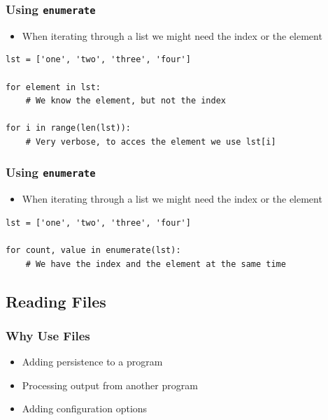 \documentclass[11pt]{beamer}
\begin{document}
\begin{frame}[fragile]\frametitle{Using \texttt{enumerate}}
\begin{itemize}
\item When iterating through a list we might need the index or the element
\end{itemize}
\begin{lstlisting}
lst = ['one', 'two', 'three', 'four']

for element in lst:
    # We know the element, but not the index

for i in range(len(lst)):
    # Very verbose, to acces the element we use lst[i]
\end{lstlisting}
\end{frame}

\begin{frame}[fragile]\frametitle{Using \texttt{enumerate}}
\begin{itemize}
\item When iterating through a list we might need the index or the element
\end{itemize}
\begin{lstlisting}
lst = ['one', 'two', 'three', 'four']

for count, value in enumerate(lst):
    # We have the index and the element at the same time
\end{lstlisting}
\end{frame}


\subsection{Reading Files}

\begin{frame}\frametitle{Why Use Files}
\begin{itemize}
\item Adding persistence to a program
\item Processing output from another program
\item Adding configuration options
\end{itemize}

\end{frame}
\end{document}
